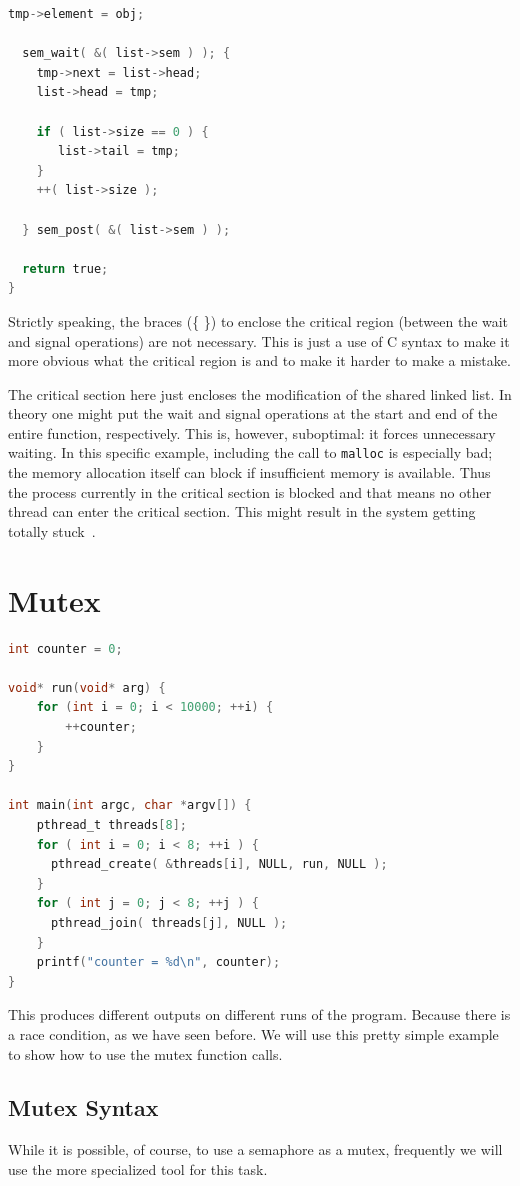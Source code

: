 \documentclass[a4paper]{report}
\begin{document}
\begin{appendices}
\begin{lstlisting}[language=C]
  tmp->element = obj;
  
  sem_wait( &( list->sem ) ); {
    tmp->next = list->head;
    list->head = tmp;

    if ( list->size == 0 ) {
       list->tail = tmp;
    }
    ++( list->size );
  
  } sem_post( &( list->sem ) );  
  
  return true;
}
\end{lstlisting}

Strictly speaking, the braces (\{ \}) to enclose the critical region (between the wait and signal operations) are not necessary. This is just a use of C syntax to make it more obvious what the critical region is and to make it harder to make a mistake.

The critical section here just encloses the modification of the shared linked list. In theory one might put the wait and signal operations at the start and end of the entire function, respectively. This is, however, suboptimal: it forces unnecessary waiting. In this specific example, including the call to \texttt{malloc} is especially bad; the memory allocation itself can block if insufficient memory is available. Thus the process currently in the critical section is blocked and that means no other thread can enter the critical section. This might result in the system getting totally stuck~\cite{mte241}.

\section*{Mutex}

  \begin{lstlisting}[language=C]
int counter = 0;

void* run(void* arg) {
    for (int i = 0; i < 10000; ++i) {
        ++counter;
    }
}

int main(int argc, char *argv[]) {
    pthread_t threads[8];
    for ( int i = 0; i < 8; ++i ) {
      pthread_create( &threads[i], NULL, run, NULL );
    }
    for ( int j = 0; j < 8; ++j ) {
      pthread_join( threads[j], NULL );
    }
    printf("counter = %d\n", counter);
}
  \end{lstlisting}

This produces different outputs on different runs of the program. Because there is a race condition, as we have seen before. We will use this pretty simple example to show how to use the mutex function calls.

\subsection*{Mutex Syntax}
 While it is possible, of course, to use a semaphore as a mutex, frequently we will use the more specialized tool for this task.


\end{appendices}
\end{document}

